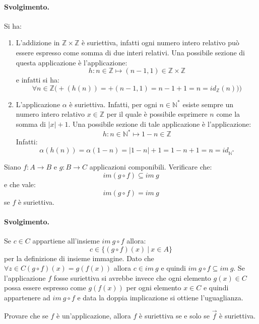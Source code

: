 \paragraph*{Svolgimento.} Si ha:
\begin{enumerate}
	\item L'addizione in $\mathbb{Z} \times \mathbb{Z}$ è suriettiva, infatti ogni numero intero relativo può essere espresso come somma di due interi relativi. Una possibile sezione di questa applicazione è l'applicazione:
	\begin{displaymath}
		h: n \in \mathbb{Z} \mapsto (n-1,1) \in \mathbb{Z} \times \mathbb{Z}
	\end{displaymath}
	e infatti si ha:
	\begin{displaymath}
		\forall n \in \mathbb{Z} \bigl( +(h(n)) = +(n-1,1) = n-1+1= n = id_{\mathbb{Z}}(n))\bigr)
	\end{displaymath}
	\item L'applicazione $\alpha$ è suriettiva. Infatti, per ogni $n \in \mathbb{N}^{*}$ esiste sempre un numero intero relativo $x \in \mathbb{Z}$ per il quale è possibile esprimere $n$ come la somma di $|x|+1$. Una possibile sezione di tale applicazione è l'applicazione:
	\begin{displaymath}
		h: n \in \mathbb{N}^{*} \mapsto 1-n \in \mathbb{Z}
	\end{displaymath}
	Infatti:
	\begin{displaymath}
		\alpha(h(n))=\alpha(1-n)=|1-n|+1=1-n+1=n = id_{\mathbb{N}^{*}}
	\end{displaymath}
\end{enumerate}
\begin{exsbox}
	Siano $f:A \longrightarrow B$ e $g: B \longrightarrow C$ applicazioni componibili. Verificare che: $$im(g \circ f) \subseteq im \ g$$ e che vale: $$im(g \circ f) = im \ g $$ se $f$ è suriettiva.
\end{exsbox}
\paragraph*{Svolgimento.} Se $c \in C$ appartiene all'insieme $im \ g \circ f$ allora:
\begin{displaymath}
	c \in \{ (g \circ f )(x) \ | \ x \in A \}
\end{displaymath}
per la definizione di insieme immagine. Dato che $\forall z \in C (g \circ f)(x)= g(f(x))$ allora $c \in im \ g$ e quindi $im \ g \circ f \subseteq im \ g$. Se l'applicazione $f$ fosse suriettiva si avrebbe invece  che ogni elemento $g(x) \in  C$ possa essere espresso come $g(f(x))$ per ogni elemento $x \in C$ e quindi appartenere ad $im \ g \circ f$ e data la doppia implicazione si ottiene l'uguaglianza. \hfill \blacksquare
\begin{exsbox}
	Provare che se $f$ è un'applicazione, allora $f$ è suriettiva se e solo se $\stackrel{\rightarrow}{f}$ è suriettiva.
\end{exsbox}
